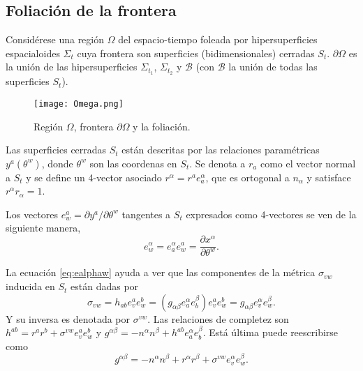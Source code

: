
\subsection{Foliaci\'{o}n de la frontera}
\label{subsec:foliacionfrontera}

Consid\'{e}rese una regi\'{o}n $\Omega$ del espacio-tiempo foleada por hipersuperficies espacialoides $\Sigma_{t}$ cuya frontera son superficies (bidimensionales) cerradas $S_{t}$. $\partial \Omega$ es la uni\'{o}n de las hipersuperficies $\Sigma_{t_{1}}$, $\Sigma_{t_{2}}$ y $\mathcal{B}$ (con $\mathcal{B}$ la uni\'{o}n de todas las superficies $S_{t}$).

\begin{figure}[H]
\centering
\texttt{[image: Omega.png]}
\caption{Regi\'{o}n $\Omega$, frontera $\partial \Omega$ y la foliaci\'{o}n.}\label{fig:OmegaandboundOmega}
\end{figure}

Las superficies cerradas $S_{t}$ est\'{a}n descritas por las relaciones param\'{e}tricas $y^{a} (\theta^{w})$, donde $\theta^{w}$ son las coordenas en $S_{t}$. Se denota a $r_{a}$ como el vector normal a $S_{t}$ y se define un 4-vector asociado $r^{\alpha} = r^{a} e^{\alpha}_{a}$, que es ortogonal a $n_{\alpha}$ y satisface $r^{\alpha} r_{\alpha} = 1$.

Los vectores $e^{a}_{w} = \partial y^{a} / \partial \theta^{w}$ tangentes a $S_{t}$ expresados como 4-vectores se ven de la siguiente manera,
%
\begin{equation}
\label{eq:ealphaw}
e^{\alpha}_{w} = e^{\alpha}_{a} e^{a}_{w} = \frac{\partial x^{\alpha}}{\partial \theta^{w}}.
\end{equation}

La ecuaci\'{o}n \eqref{eq:ealphaw} ayuda a ver que las componentes de la m\'{e}trica $\sigma_{vw}$ inducida en $S_{t}$ est\'{a}n dadas por
%
\begin{equation}
\label{eq:metricSt}
\sigma_{vw} = h_{ab} e^{a}_{v} e^{b}_{w}
= (g_{\alpha \beta} e^{\alpha}_{a} e^{\beta}_{b}) e^{a}_{v} e^{b}_{w}
= g_{\alpha \beta} e^{\alpha}_{v} e^{\beta}_{w}.
\end{equation}
%
Y su inversa es denotada por $\sigma^{vw}$. Las relaciones de completez son $h^{ab} = r^{a} r^{b} + \sigma^{vw} e^{a}_{v} e^{b}_{w}$ y $g^{\alpha \beta} = -n^{\alpha} n^{\beta} + h^{ab} e^{\alpha}_{a} e^{\beta}_{b}$. Est\'{a} \'{u}ltima puede reescribirse como
%
\begin{equation}
\label{eq:complt}
g^{\alpha \beta} = -n^{\alpha} n^{\beta} + r^{\alpha} r^{\beta} + \sigma^{vw} e^{\alpha}_{v} e^{\beta}_{w}.
\end{equation}

